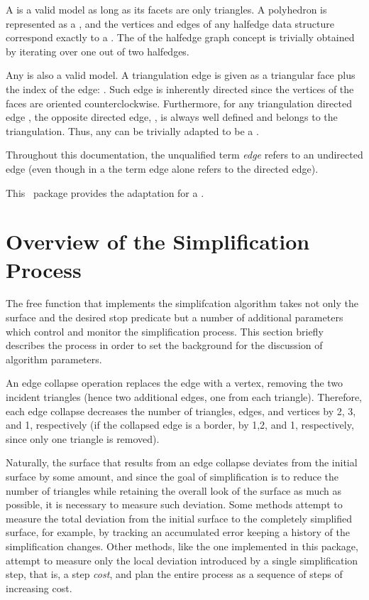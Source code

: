 A  is a valid  model as long as its facets are only triangles. A polyhedron is represented as a , and the vertices and edges of any halfedge data structure correspond exactly to a . The  of the halfedge graph concept is trivially obtained by iterating over one out of two halfedges.

Any  is also a valid  model. A triangulation edge is given as a triangular face  plus the index of the edge: . Such edge is inherently directed since the vertices of the faces are oriented counterclockwise. Furthermore, for any triangulation directed edge , the opposite directed edge, , is always well defined and belongs to the triangulation. Thus, any  can be trivially adapted to be a . 

Throughout this documentation, the unqualified term {\em edge} refers to an undirected edge (even though in a  the term edge alone refers to the directed edge).

This \cgal\ package provides the adaptation for a .

\section{Overview of the Simplification Process}

The free function that implements the simplifcation algorithm takes not only the surface and the desired stop predicate but a number of additional parameters which control and monitor the simplification process. This section briefly describes the process in order to set the background for the discussion of algorithm parameters.

An edge collapse operation replaces the edge with a vertex, removing the two incident triangles (hence two additional edges, one from each triangle). Therefore, each edge collapse decreases the number of triangles, edges, and vertices by 2, 3, and 1, respectively (if the collapsed edge is a border, by 1,2, and 1, respectively, since only one triangle is removed).

Naturally, the surface that results from an edge collapse deviates from the initial surface by some amount, and since the goal of simplification is to reduce the number of triangles while retaining the overall look of the surface as much as possible, it is necessary to measure such deviation. Some methods attempt to measure the total deviation from the initial surface to the completely simplified surface, for example, by tracking an accumulated error keeping a history of the simplification changes. Other methods, like the one implemented in this package, attempt to measure only the local deviation introduced by a single simplification step, that is, a step {\em cost}, and plan the entire process as a sequence of steps of increasing cost. 

